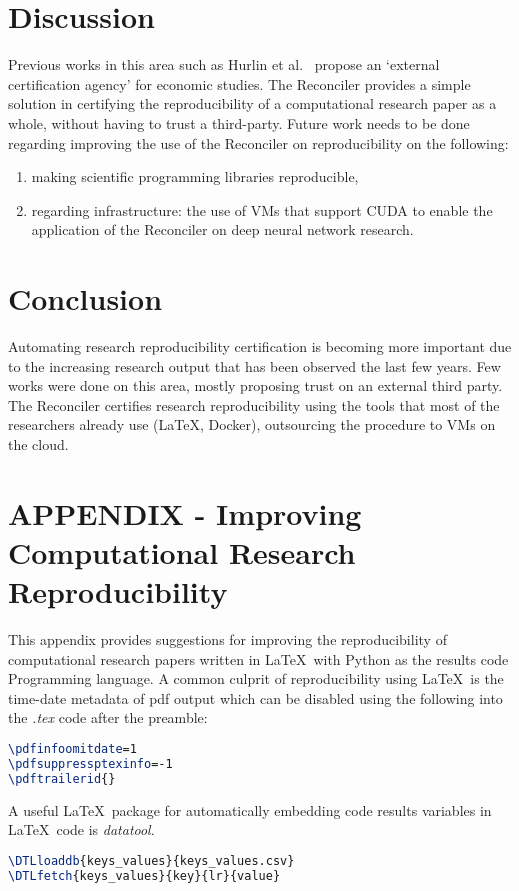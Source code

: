 \documentclass[journal]{IEEEtran}
\begin{document}
\section{Discussion}
Previous works in this area such as Hurlin et al.~\cite{hurlin2019reproducibility} propose an `external certification agency' for economic studies.
The Reconciler provides a simple solution in certifying the reproducibility of a computational research paper as a whole, without having to trust a third-party.
Future work needs to be done regarding improving the use of the Reconciler on reproducibility on the following:
\begin{enumerate}
	\item making scientific programming libraries reproducible,
	\item regarding infrastructure: the use of VMs that support CUDA to enable the application of the Reconciler on deep neural network research.
\end{enumerate}

\section{Conclusion}
Automating research reproducibility certification is becoming more important due to the increasing research output that has been observed the last few years.
Few works were done on this area, mostly proposing trust on an external third party.
The Reconciler certifies research reproducibility using the tools that most of the researchers already use (\LaTeX, Docker), outsourcing the procedure to VMs on the cloud.

\section{APPENDIX - Improving Computational Research Reproducibility}
This appendix provides suggestions for improving the reproducibility of computational research papers written in \LaTeX\ with Python as the results code Programming language.
A common culprit of reproducibility using \LaTeX\ is the time-date metadata of pdf output which can be disabled using the following into the \textit{.tex} code after the preamble:
\begin{lstlisting}[language=TeX, style=lststyle, caption={\LaTeX\ pdf reproducibility commands for preamble.}, captionpos=b]
\pdfinfoomitdate=1
\pdfsuppressptexinfo=-1
\pdftrailerid{}
\end{lstlisting}

A useful \LaTeX\ package for automatically embedding code results variables in \LaTeX\ code is \textit{datatool}.
\begin{lstlisting}[language=TeX, style=lststyle, caption={\LaTeX\ datatool example of loading a file that contains pairs of keys and values (keys\_values.csv) generated by a results code and getting the value of a key named lr.}, captionpos=b]
\DTLloaddb{keys_values}{keys_values.csv}
\DTLfetch{keys_values}{key}{lr}{value}
\end{lstlisting}
\end{document}
